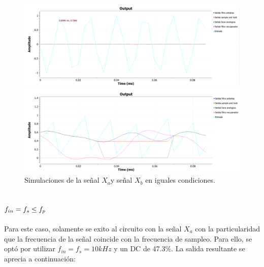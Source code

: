 \documentclass[../../ASSD_TP1_G7.tex]{subfiles}
\begin{document}
\begin{figure}[H]

\begin{centering}
\includegraphics[scale=0.5]{Imagenes/simulacion_llave_seno_b2.PNG}
\par\end{centering}
\begin{centering}
\includegraphics[scale=0.5]{Imagenes/simulacion_llave_diente_b2.PNG}
\par\end{centering}
\centering{}\caption{Simulaciones de la señal $X_{a}$y señal $X_{b}$ en iguales condiciones.}
\end{figure}


\subsection{$f_{in}=f_{s}\protect\leq f_{p}$}

Para este caso, solamente se exito al circuito con la señal $X_{a}$
con la particularidad que la frecuencia de la señal coincide con la
frecuencia de sampleo. Para ello, se optó por utilizar $f_{in}=f_{s}=10kHz$
y un DC de 47.3\%. La salida resultante se aprecia a continuación:
\end{document}
